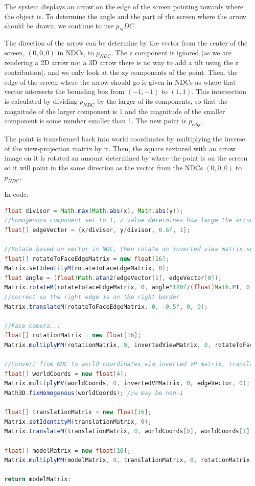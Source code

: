 The system displays an arrow on the edge of the screen pointing towards where the object is. To determine the angle and the part of the screen where the arrow should be drawn, we continue to use $p_NDC$.

The direction of the arrow can be determine by the vector from the center of the screen, $(0, 0, 0)$ in NDCs, to $p_{NDC}$. The z component is ignored (as we are rendering a 2D arrow not a 3D arrow there is no way to add a tilt using the z contribution), and we only look at the xy components of the point. Then, the edge of the screen where the arrow should go is given in NDCs as where that vector intersects the bounding box from $(-1, -1)$ to $(1, 1)$. This intersection is calculated by dividing $p_{NDC}$ by the larger of its components, so that the magnitude of the larger component is 1 and the magnitude of the smaller component is some number smaller than 1. The new point is $p_{edge}$.

The point is transformed back into world coordinates by multiplying the inverse of the view-projection matrix by it. Then, the square textured with an arrow image on it is rotated an amount determined by where the point is on the screen so it will point in the same direction as the vector from the NDCs $(0, 0, 0)$ to $p_{NDC}$. 

In code:

\begin{lstlisting}[language=Java]
float divisor = Math.max(Math.abs(x), Math.abs(y));
//homogenous component set to 1, z value determines how large the arrow is later
float[] edgeVector = {x/divisor, y/divisor, 0.6f, 1}; 

//Rotate based on vector in NDC, then rotate on inverted view matrix so it faces the camera
float[] rotateToFaceEdgeMatrix = new float[16];
Matrix.setIdentityM(rotateToFaceEdgeMatrix, 0);
float angle = (float)Math.atan2(edgeVector[1], edgeVector[0]);
Matrix.rotateM(rotateToFaceEdgeMatrix, 0, angle*180f/(float)Math.PI, 0, 0, 1f);
//correct so the right edge is on the right border
Matrix.translateM(rotateToFaceEdgeMatrix, 0, -0.5f, 0, 0); 

//Face camera...
float[] rotationMatrix = new float[16];
Matrix.multiplyMM(rotationMatrix, 0, invertedViewMatrix, 0, rotateToFaceEdgeMatrix, 0);

//Convert from NDC to world coordinates via inverted VP matrix, translate matrix to that
float[] worldCoords = new float[4];
Matrix.multiplyMV(worldCoords, 0, invertedVPMatrix, 0, edgeVector, 0);
Math3D.fixHomogenous(worldCoords); //w may be non-1

float[] translationMatrix = new float[16];
Matrix.setIdentityM(translationMatrix, 0);
Matrix.translateM(translationMatrix, 0, worldCoords[0], worldCoords[1], worldCoords[2]);

float[] modelMatrix = new float[16];
Matrix.multiplyMM(modelMatrix, 0, translationMatrix, 0, rotationMatrix, 0);

return modelMatrix;
\end{lstlisting}

